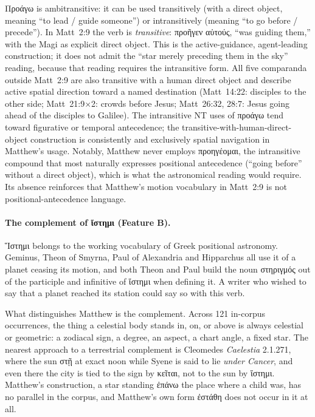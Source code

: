 \documentclass[11pt,a4paper]{article}
\newcommand{\grk}[1]{{\fontencoding{LGR}\selectfont #1}}
\newcommand{\grk}[1]{{\greekfont #1}}
\begin{document}
\grk{Προάγω} is ambitransitive: it can be used transitively (with a direct
object, meaning ``to lead / guide someone'') or intransitively (meaning ``to go
before / precede''). In Matt~2:9 the verb is \textit{transitive}:
\grk{προῆγεν αὐτούς}, ``was guiding them,'' with the Magi as explicit direct
object. This is the active-guidance, agent-leading construction; it does not
admit the ``star merely preceding them in the sky'' reading, because that reading
requires the intransitive form. All five comparanda outside Matt~2:9 are also
transitive with a human direct object and describe active spatial direction toward
a named destination (Matt~14:22: disciples to the other side; Matt~21:9$\times$2:
crowds before Jesus; Matt~26:32, 28:7: Jesus going ahead of the disciples to
Galilee). The intransitive NT uses of \grk{προάγω} tend toward figurative or
temporal antecedence; the transitive-with-human-direct-object construction is
consistently and exclusively spatial navigation in Matthew's usage.
Notably, Matthew never employs \grk{προηγέομαι}, the intransitive compound
that most naturally expresses positional antecedence (``going before'' without
a direct object), which is what the astronomical reading would require.
Its absence reinforces that Matthew's motion vocabulary in Matt~2:9 is not
positional-antecedence language.

\paragraph{The complement of \grk{ἵστημι} (Feature B).}

\grk{Ἵστημι} belongs to the working vocabulary of Greek positional astronomy.
Geminus, Theon of Smyrna, Paul of Alexandria and Hipparchus all use it of a
planet ceasing its motion, and both Theon and Paul build the noun
\grk{στηριγμός} out of the participle and infinitive of \grk{ἵστημι} when
defining it. A writer who wished to say that a planet reached its station
could say so with this verb.

What distinguishes Matthew is the complement. Across 121 in-corpus
occurrences, the thing a celestial body stands in, on, or above is always
celestial or geometric: a zodiacal sign, a degree, an aspect, a chart angle, a
fixed star. The nearest approach to a terrestrial complement is
Cleomedes \textit{Caelestia} 2.1.271, where the sun \grk{στῇ} at exact noon
while Syene is said to lie \emph{under Cancer}, and even there the city is
tied to the sign by \grk{κεῖται}, not to the sun by \grk{ἵστημι}. Matthew's
construction, a star standing \grk{ἐπάνω} the place where a child was, has no
parallel in the corpus, and Matthew's own form \grk{ἐστάθη} does not occur in
it at all.
\end{document}
